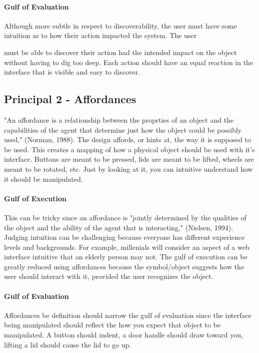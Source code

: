 \paragraph{Gulf of Evaluation}
Although more subtle in respect to discoverability, the user must have some intuition as to how their action impacted the system. The user

\clearpage

must be able to discover their action had the intended impact on the object without having to dig too deep. Each action should have an equal reaction in the interface that is visible and easy to discover.

\subsection{Principal 2 - Affordances}
"An affordance is a relationship between the proprties of an object and the capabilities of the agent that determine just how the object could be possibly used," (Norman, 1988). The design affords, or hints at, the way it is supposed to be used. This creates a mapping of how a physical object should be used with it's interface. Buttons are meant to be pressed, lids are meant to be lifted, wheels are meant to be rotated, etc. Just by looking at it, you can intuitive understand how it should be manipulated.

\paragraph{Gulf of Execution}
This can be tricky since an affordance is "jointly determined by the qualities of the object and the ability of the agent that is interacting," (Nielsen, 1994). Judging intuition can be challenging because everyone has different experience levels and backgrounds. For example, millenials will consider an aspect of a web interface intuitive that an elderly person may not. The gulf of execution can be greatly reduced using affordances because the symbol/object suggests how the user should interact with it, provided the user recognizes the object.

\paragraph{Gulf of Evaluation}
Affordances be definition should narrow the gulf of evaluation since the interface being manipulated should reflect the how you expect that object to be manipulated. A button should indent, a door handle should draw toward you, lifting a lid should cause the lid to go up.

